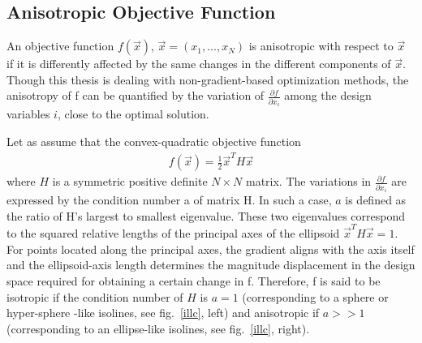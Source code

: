 
\subsection{Anisotropic Objective Function}
\label{IllCon}
An objective function $f(\vec{x})$, $\vec{x}=(x_1,...,x_N)$  is anisotropic with respect to $\vec{x}$ if it is differently affected by the same changes in the different components of $\vec{x}$. Though this thesis is dealing with non-gradient-based optimization methods, the anisotropy of f can be quantified by the variation of $\frac{\partial f}{\partial x_i}$ among the design variables $i$, close to the optimal solution. 



Let as assume that the convex-quadratic objective function
\begin{eqnarray}
   f(\vec{x}) = \frac{1}{2}\vec{x}^TH\vec{x}
   \label{conv.1}
\end{eqnarray}
where $H$ is a symmetric positive definite $N \times N$ matrix.
The variations in $\frac{\partial f}{\partial x_i}$  are expressed by the condition number a of matrix H. In such a case, $a$ is defined as the ratio of H's largest to smallest eigenvalue. 
These two eigenvalues correspond to the squared relative lengths of the principal axes of the ellipsoid $\vec{x}^TH\vec{x}\! =\! 1$. For points located along the principal axes, the gradient aligns with the axis itself and the ellipsoid-axis length determines the magnitude displacement in the design space required for obtaining a certain change in f. Therefore, f is said to be isotropic if the condition number of $H$ is $a=1$ (corresponding to a sphere or hyper-sphere -like isolines, see fig.\ \ref{illc}, left) and anisotropic if $a\!>>\!1$ (corresponding to an ellipse-like isolines, see fig.\ \ref{illc}, right).

  


